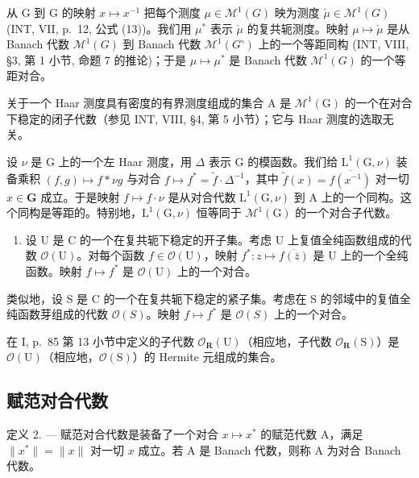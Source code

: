 从 G 到 G 的映射 \(x \mapsto x^{-1}\) 把每个测度 \(\mu \in \mathcal{M}^{1}(G)\) 映为测度 \(\check{\mu} \in \mathcal{M}^{1}(G)\) (INT, VII, p.~12, 公式 (13))。我们用 \(\mu^{*}\) 表示 \(\check{\mu}\) 的复共轭测度。映射 \(\mu \mapsto \check{\mu}\) 是从 Banach 代数 \(\mathcal{M}^{1}(G)\) 到 Banach 代数 \(\mathcal{M}^{1}(G^{\circ})\) 上的一个等距同构 (INT, VIII, §3, 第 1 小节, 命题 7 的推论)；于是 \(\mu \mapsto \mu^{*}\) 是 Banach 代数 \(\mathcal{M}^{1}(G)\) 的一个等距对合。

关于一个 Haar 测度具有密度的有界测度组成的集合 A 是 \(\mathcal{M}^{1}(\mathrm{G})\) 的一个在对合下稳定的闭子代数（参见 INT, VIII, §4, 第 5 小节）；它与 Haar 测度的选取无关。

设 \(\nu\) 是 G 上的一个左 Haar 测度，用 \(\Delta\) 表示 G 的模函数。我们给 \(\mathrm{L}^1 (\mathrm{G},\nu)\) 装备乘积 \((f,g)\mapsto f*\nu g\) 与对合 \(f\mapsto f^{*} = \widetilde{f}\cdot \Delta^{-1}\)，其中 \(\widetilde{f} (x) = \overline{f(x^{-1})}\) 对一切 \(x\in \mathbf{G}\) 成立。于是映射 \(f\mapsto f\cdot \nu\) 是从对合代数 \(\mathrm{L}^1 (\mathrm{G},\nu)\) 到 A 上的一个同构。这个同构是等距的。特别地，\(\mathrm{L}^1 (\mathrm{G},\nu)\) 恒等同于 \(\mathcal{M}^1 (\mathrm{G})\) 的一个对合子代数。

\begin{enumerate}
\def\labelenumi{\arabic{enumi})}
\setcounter{enumi}{4}
\tightlist
\item
  设 U 是 C 的一个在复共轭下稳定的开子集。考虑 U 上复值全纯函数组成的代数 \(\mathcal{O}(\mathrm{U})\)。对每个函数 \(f \in \mathcal{O}(\mathrm{U})\)，映射 \(f^{*}: z \mapsto \overline{f(\overline{z})}\) 是 U 上的一个全纯函数。映射 \(f \mapsto f^{*}\) 是 \(\mathcal{O}(\mathrm{U})\) 上的一个对合。
\end{enumerate}

类似地，设 S 是 C 的一个在复共轭下稳定的紧子集。考虑在 S 的邻域中的复值全纯函数芽组成的代数 \(\mathcal{O}(S)\)。映射 \(f \mapsto f^{*}\) 是 \(\mathcal{O}(S)\) 上的一个对合。

在 I, p.~85 第 13 小节中定义的子代数 \(\mathcal{O}_{\mathbf{R}}(\mathrm{U})\)（相应地，子代数 \(\mathcal{O}_{\mathbf{R}}(\mathrm{S})\)）是 \(\mathcal{O}(\mathrm{U})\)（相应地，\(\mathcal{O}(\mathrm{S})\)）的 Hermite 元组成的集合。

\subsection{赋范对合代数}

定义 2. --- 赋范对合代数是装备了一个对合 \(x \mapsto x^{*}\) 的赋范代数 A，满足 \(\|x^{*}\| = \|x\|\) 对一切 \(x\) 成立。若 A 是 Banach 代数，则称 A 为对合 Banach 代数。

